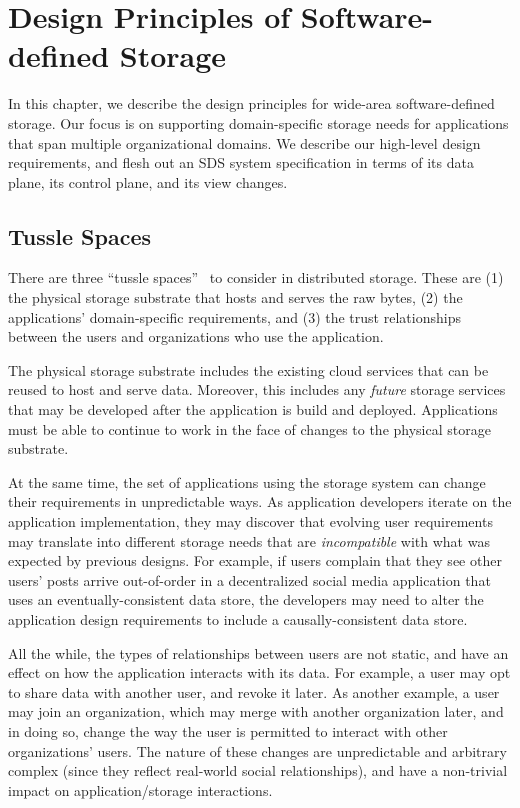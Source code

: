 \chapter{Design Principles of Software-defined Storage}
\label{chap:design_principles}

In this chapter, we describe the design principles for wide-area
software-defined storage.  Our focus is on supporting domain-specific storage
needs for applications that span multiple
organizational domains.  We describe our high-level design requirements,
and flesh out an SDS system specification in terms of its data plane, its
control plane, and its view changes.

\section{Tussle Spaces}

There are three ``tussle spaces''~\cite{david-clark-tussle-spaces} to consider in distributed storage.
These are (1) the physical storage substrate that hosts and serves the raw
bytes, (2) the applications' domain-specific requirements, and (3) the trust
relationships between the users and organizations who use the application.

The physical storage substrate includes the existing cloud services that can be
reused to host and serve data.  Moreover, this includes any \emph{future}
storage services that may be developed after the application is build and
deployed.  Applications must be able to continue to work in the face of changes
to the physical storage substrate.

At the same time, the set of applications using the storage system can change
their requirements in unpredictable ways.  As application developers iterate on
the application implementation, they may discover that evolving user
requirements may translate into different storage needs that are
\emph{incompatible} with what was expected by previous designs.  For example, if
users complain that they see other users' posts arrive out-of-order in a
decentralized social media application that uses an eventually-consistent data
store, the developers may need to alter the application design requirements to
include a causally-consistent data store.

All the while, the types of relationships between users are not static, and have
an effect on how the application interacts with its data.  For example, a user may opt
to share data with another user, and revoke it later.  As another example, a user may join an
organization, which may merge with another organization later, and in doing so, change the
way the user is permitted to interact with other organizations' users.  The nature of these
changes are unpredictable and arbitrary complex (since they reflect real-world
social relationships), and have a non-trivial impact on application/storage
interactions.

